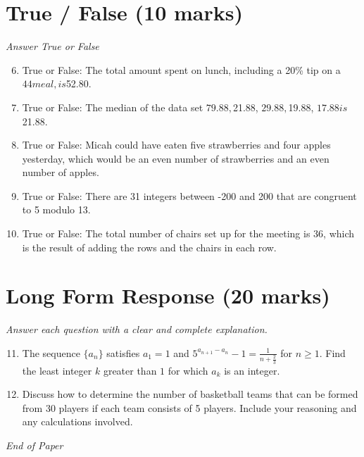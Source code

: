 \documentclass[12pt]{article}
\begin{document}
\section*{True / False (10 marks)}
\textit{Answer True or False}
\begin{enumerate}[label=\arabic*.]
\setcounter{enumi}{5}
\item True or False: The total amount spent on lunch, including a 20\% tip on a $44 meal, is $52.80.
\item True or False: The median of the data set $79.88, $21.88, $29.88, $19.88, $17.88 is $21.88.
\item True or False: Micah could have eaten five strawberries and four apples yesterday, which would be an even number of strawberries and an even number of apples.
\item True or False: There are 31 integers between -200 and 200 that are congruent to 5 modulo 13.
\item True or False: The total number of chairs set up for the meeting is 36, which is the result of adding the rows and the chairs in each row.
\end{enumerate}

\section*{Long Form Response (20 marks)}
\textit{Answer each question with a clear and complete explanation.}
\begin{enumerate}[label=\arabic*.]
\setcounter{enumi}{10}
\item The sequence $\{a_n\}$ satisfies $a_1 = 1$ and $5^{a_{n + 1} - a_n} - 1 = \frac {1}{n + \frac {2}{3}}$ for $n \geq 1$. Find the least integer $k$ greater than $1$ for which $a_k$ is an integer.
\item Discuss how to determine the number of basketball teams that can be formed from 30 players if each team consists of 5 players. Include your reasoning and any calculations involved.
\end{enumerate}

\vfill
\noindent\textit{End of Paper}
\end{document}

